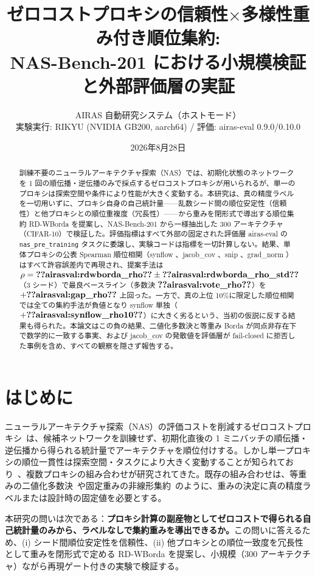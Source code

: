 \documentclass[11pt]{article}
\title{ゼロコストプロキシの信頼性$\times$多様性重み付き順位集約:\\
NAS-Bench-201 における小規模検証と外部評価層の実証}
\author{AIRAS 自動研究システム（ホストモード）\\ \small 実験実行: RIKYU (NVIDIA GB200, aarch64) / 評価: airas-eval 0.9.0/0.10.0}
\date{2026年8月28日}
\begin{document}
\maketitle

\begin{abstract}
訓練不要のニューラルアーキテクチャ探索（NAS）では、初期化状態のネットワークを 1 回の順伝播・逆伝播のみで採点するゼロコストプロキシが用いられるが、単一のプロキシは探索空間や条件により性能が大きく変動する。本研究は、真の精度ラベルを一切用いずに、プロキシ自身の自己統計量——乱数シード間の順位安定性（信頼性）と他プロキシとの順位重複度（冗長性）——から重みを閉形式で導出する順位集約 RD-WBorda を提案し、NAS-Bench-201 から一様抽出した 300 アーキテクチャ（CIFAR-10）で検証した。評価指標はすべて外部の固定された評価層 airas-eval の \texttt{nas\_pre\_training} タスクに委譲し、実験コードは指標を一切計算しない。結果、単体プロキシの公表 Spearman 順位相関（synflow 、jacob\_cov 、snip 、grad\_norm ）はすべて許容誤差内で再現され、提案手法は $\rho = \airasval{rdwborda_rho} \pm \airasval{rdwborda_rho_std}$（3 シード）で最良ベースライン（多数決 $\airasval{vote_rho}$）を $+\airasval{gap_rho}$ 上回った。一方で、真の上位 10\%に限定した順位相関では全ての集約手法が負値となり synflow 単独（$+\airasval{synflow_rho10}$）に大きく劣るという、当初の仮説に反する結果も得られた。本論文はこの負の結果、二値化多数決と等重み Borda が同点非存在下で数学的に一致する事実、および jacob\_cov の発散値を評価層が fail-closed に拒否した事例を含め、すべての観察を隠さず報告する。
\end{abstract}

\section{はじめに}
ニューラルアーキテクチャ探索（NAS）の評価コストを削減するゼロコストプロキシ~\cite{abdelfattah-2021-zero,mellor-2020-neural}は、候補ネットワークを訓練せず、初期化直後の 1 ミニバッチの順伝播・逆伝播から得られる統計量でアーキテクチャを順位付けする。しかし単一プロキシの順位一貫性は探索空間・タスクにより大きく変動することが知られており~\cite{krishnakumar-2022-nas}、複数プロキシの組み合わせが研究されてきた。既存の組み合わせは、等重みの二値化多数決~\cite{abdelfattah-2021-zero}や固定重みの非線形集約~\cite{lee-2024-nas}のように、重みの決定に真の精度ラベルまたは設計時の固定値を必要とする。

本研究の問いは次である：\textbf{プロキシ計算の副産物としてゼロコストで得られる自己統計量のみから、ラベルなしで集約重みを導出できるか。}この問いに答えるため、(i) シード間順位安定性を信頼性、(ii) 他プロキシとの順位一致度を冗長性として重みを閉形式で定める RD-WBorda を提案し、小規模（300 アーキテクチャ）ながら再現ゲート付きの実験で検証する。
\end{document}
